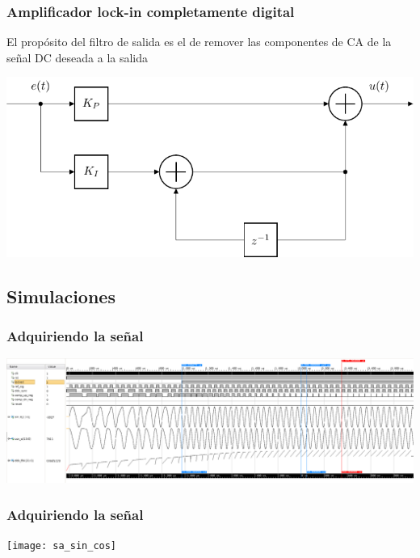 \documentclass{beamer}
\begin{document}
\begin{frame}
\frametitle{Amplificador lock-in completamente digital}
El propósito del filtro de salida es el de remover las componentes de CA de la
señal DC deseada a la salida
\begin{block}{}
\begin{center}
\includegraphics[width=\textwidth]{loop_filter}
\end{center}
\end{block}
\end{frame} 

\subsection{Simulaciones}
\begin{frame}
\frametitle{Adquiriendo la señal}
\begin{center}
\includegraphics[width=\textwidth]{get_lock_white2}
\end{center}
\end{frame} 

\begin{frame}
\frametitle{Adquiriendo la señal}
\begin{center}
\texttt{[image: sa\_sin\_cos]}
\end{center}
\end{frame} 
\end{document}
